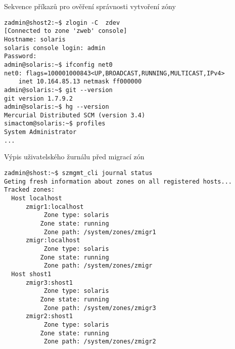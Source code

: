 \begin{listing}[ht]
  \caption{Sekvence příkazů pro ověření správnosti vytvoření zóny}  
  \begin{verbatim} 
zadmin@shost2:~$ zlogin -C  zdev
[Connected to zone 'zweb' console]
Hostname: solaris
solaris console login: admin
Password:
admin@solaris:~$ ifconfig net0
net0: flags=100001000843<UP,BROADCAST,RUNNING,MULTICAST,IPv4>
    inet 10.164.85.13 netmask ff000000
admin@solaris:~$ git --version
git version 1.7.9.2
admin@solaris:~$ hg --version
Mercurial Distributed SCM (version 3.4)
simactom@solaris:~$ profiles
System Administrator
...
  \end{verbatim}
  \label{code:test:deployment:result}
\end{listing}

\begin{listing}[ht]
  \caption{Výpis uživatelského žurnálu před migrací zón}  
  \begin{verbatim}
zadmin@shost:~$ szmgmt_cli journal status
Geting fresh information about zones on all registered hosts...
Tracked zones:
  Host localhost
      zmigr1:localhost
           Zone type: solaris
          Zone state: running
           Zone path: /system/zones/zmigr1
      zmigr:localhost
           Zone type: solaris
          Zone state: running
           Zone path: /system/zones/zmigr                 
  Host shost1
      zmigr3:shost1
           Zone type: solaris
          Zone state: running
           Zone path: /system/zones/zmigr3
      zmigr2:shost1
           Zone type: solaris
          Zone state: running
           Zone path: /system/zones/zmigr2      
  \end{verbatim}
  \label{code:test:migration:before}
\end{listing}

